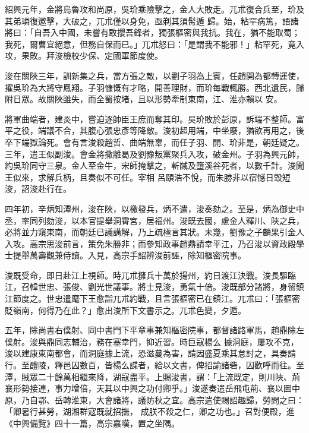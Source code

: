 \begin{pinyinscope}
 紹興元年，金將烏魯攻和尚原，吳玠乘險擊之，金人大敗走。兀朮復合兵至，玠及其弟璘復邀擊，大破之，兀朮僅以身免，亟剃其須髯遁
 歸。始，粘罕病篤，語諸將曰：「自吾入中國，未嘗有敢攖吾鋒者，獨張樞密與我抗。我在，猶不能取蜀；我死，爾曹宜絕意，但務自保而已。」兀朮怒曰：「是謂我不能邪！」粘罕死，竟入攻，果敗。拜浚檢校少保、定國軍節度使。



 浚在關陜三年，訓新集之兵，當方張之敵，以劉子羽為上賓，任趙開為都轉運使，擢吳玠為大將守鳳翔。子羽慷慨有才略，開善理財，而玠每戰輒勝。西北遺民，歸附日眾。故關陜雖失，而全蜀按堵，且以形勢牽制東南，江、淮亦賴以
 安。



 將軍曲端者，建炎中，嘗迫逐帥臣王庶而奪其印。吳玠敗於彭原，訴端不整師。富平之役，端議不合，其腹心張忠彥等降敵。浚初超用端，中坐廢，猶欲再用之，後卒下端獄論死。會有言浚殺趙哲、曲端無辜，而任子羽、開、玠非是，朝廷疑之。三年，遣王似副浚。會金將撒離曷及劉豫叛黨聚兵入攻，破金州。子羽為興元帥，約吳玠同守三泉。金人至金牛，宋師掩擊之，斬馘及墮溪谷死者，以數千計。浚聞王似來，求解兵柄，且奏似不可任。宰相
 呂頤浩不悅，而朱勝非以宿憾日毀短浚，詔浚赴行在。



 四年初，辛炳知潭州，浚在陜，以檄發兵，炳不遣，浚奏劾之。至是，炳為御史中丞，率同列劾浚，以本官提舉洞霄宮，居福州。浚既去國，慮金人釋川、陜之兵，必將並力窺東南，而朝廷已議講解，乃上疏極言其狀。未幾，劉豫之子麟果引金人入攻。高宗思浚前言，策免朱勝非；而參知政事趙鼎請幸平江，乃召浚以資政殿學士提舉萬壽觀兼侍讀。入見，高宗手詔辨浚前誣，除知樞密院事。



 浚既受命，即日赴江上視師。時兀朮擁兵十萬於揚州，約日渡江決戰。浚長驅臨江，召韓世忠、張俊、劉光世議事。將士見浚，勇氣十倍。浚既部分諸將，身留鎮江節度之。世忠遣麾下王愈詣兀朮約戰，且言張樞密已在鎮江。兀朮曰：「張樞密貶嶺南，何得乃在此？」愈出浚所下文書示之。兀朮色變，夕遁。



 五年，除尚書右僕射、同中書門下平章事兼知樞密院事，都督諸路軍馬，趙鼎除左僕射。浚與鼎同志輔治，務在塞幸門，抑近習。時巨寇楊么
 據洞庭，屢攻不克，浚以建康東南都會，而洞庭據上流，恐滋蔓為害，請因盛夏乘其怠討之，具奏請行。至醴陵，釋邑囚數百，皆楊么諜者，給以文書，俾招諭諸砦，囚歡呼而往。至潭，賊眾二十餘萬相繼來降，湖寇盡平。上賜浚書，謂：「上流既定，則川陜、荊襄形勢接連，事力增倍，天其以中興之功付卿乎。」浚遂奏遣岳飛屯荊、襄以圖中原，乃自鄂、岳轉淮東，大會諸將，議防秋之宜。高宗遣使賜詔趣歸，勞問之曰：「卿暑行甚勞，湖湘群寇既就招撫，
 成朕不殺之仁，卿之功也。」召對便殿，進《中興備覽》四十一篇，高宗嘉嘆，置之坐隅。




\end{pinyinscope}
